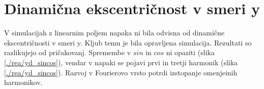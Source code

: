 \section{Dinamična ekscentričnost v smeri y}

V simulacijah z linearnim poljem napaka ni bila odvisna od dinamične ekscentričnosti v smeri y. Kljub temu je bila opravljena simulacija. Rezultati so razlikujejo od pričakovanj. Spremembe v $sin$ in $cos$ ni opaziti (slika \ref{./rea/yd_sincos}), vendar v napaki se pojavi prvi in tretji harmonik (slika \ref{./rea/yd_sincos}). Razvoj v Fourierovo vrsto potrdi izstopanje omenjeinih harmonikov.
\newpage
